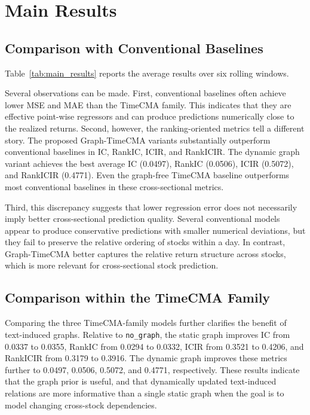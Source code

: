 \documentclass[11pt]{article}
\begin{document}
\section{Main Results}

\subsection{Comparison with Conventional Baselines}

Table~\ref{tab:main_results} reports the average results over six rolling windows.

Several observations can be made. First, conventional baselines often achieve lower MSE and MAE than the TimeCMA family. This indicates that they are effective point-wise regressors and can produce predictions numerically close to the realized returns. Second, however, the ranking-oriented metrics tell a different story. The proposed Graph-TimeCMA variants substantially outperform conventional baselines in IC, RankIC, ICIR, and RankICIR. The dynamic graph variant achieves the best average IC (0.0497), RankIC (0.0506), ICIR (0.5072), and RankICIR (0.4771). Even the graph-free TimeCMA baseline outperforms most conventional baselines in these cross-sectional metrics.

Third, this discrepancy suggests that lower regression error does not necessarily imply better cross-sectional prediction quality. Several conventional models appear to produce conservative predictions with smaller numerical deviations, but they fail to preserve the relative ordering of stocks within a day. In contrast, Graph-TimeCMA better captures the relative return structure across stocks, which is more relevant for cross-sectional stock prediction.

\subsection{Comparison within the TimeCMA Family}

Comparing the three TimeCMA-family models further clarifies the benefit of text-induced graphs. Relative to \texttt{no\_graph}, the static graph improves IC from 0.0337 to 0.0355, RankIC from 0.0294 to 0.0332, ICIR from 0.3521 to 0.4206, and RankICIR from 0.3179 to 0.3916. The dynamic graph improves these metrics further to 0.0497, 0.0506, 0.5072, and 0.4771, respectively. These results indicate that the graph prior is useful, and that dynamically updated text-induced relations are more informative than a single static graph when the goal is to model changing cross-stock dependencies.
\end{document}
